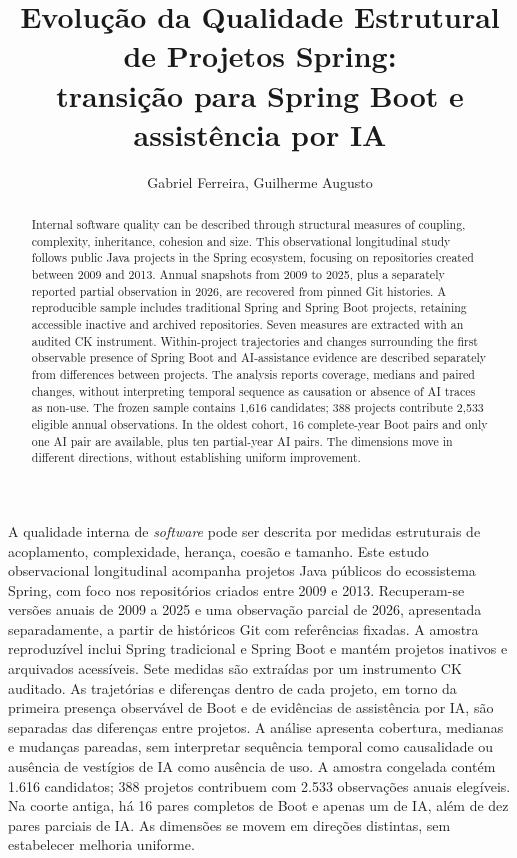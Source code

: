 \documentclass[12pt]{article}
\title{Evolução da Qualidade Estrutural de Projetos Spring:\\transição para Spring Boot e assistência por IA}
\author{Gabriel Ferreira\inst{1}, Guilherme Augusto\inst{1}}
\begin{document}
\maketitle

\begin{abstract}
Internal software quality can be described through structural measures of coupling, complexity, inheritance, cohesion and size. This observational longitudinal study follows public Java projects in the Spring ecosystem, focusing on repositories created between 2009 and 2013. Annual snapshots from 2009 to 2025, plus a separately reported partial observation in 2026, are recovered from pinned Git histories. A reproducible sample includes traditional Spring and Spring Boot projects, retaining accessible inactive and archived repositories. Seven measures are extracted with an audited CK instrument. Within-project trajectories and changes surrounding the first observable presence of Spring Boot and AI-assistance evidence are described separately from differences between projects. The analysis reports coverage, medians and paired changes, without interpreting temporal sequence as causation or absence of AI traces as non-use. The frozen sample contains 1,616 candidates; 388 projects contribute 2,533 eligible annual observations. In the oldest cohort, 16 complete-year Boot pairs and only one AI pair are available, plus ten partial-year AI pairs. The dimensions move in different directions, without establishing uniform improvement.
\end{abstract}

\begin{resumo}
A qualidade interna de \emph{software} pode ser descrita por medidas estruturais de acoplamento, complexidade, herança, coesão e tamanho. Este estudo observacional longitudinal acompanha projetos Java públicos do ecossistema Spring, com foco nos repositórios criados entre 2009 e 2013. Recuperam-se versões anuais de 2009 a 2025 e uma observação parcial de 2026, apresentada separadamente, a partir de históricos Git com referências fixadas. A amostra reproduzível inclui Spring tradicional e Spring Boot e mantém projetos inativos e arquivados acessíveis. Sete medidas são extraídas por um instrumento CK auditado. As trajetórias e diferenças dentro de cada projeto, em torno da primeira presença observável de Boot e de evidências de assistência por IA, são separadas das diferenças entre projetos. A análise apresenta cobertura, medianas e mudanças pareadas, sem interpretar sequência temporal como causalidade ou ausência de vestígios de IA como ausência de uso. A amostra congelada contém 1.616 candidatos; 388 projetos contribuem com 2.533 observações anuais elegíveis. Na coorte antiga, há 16 pares completos de Boot e apenas um de IA, além de dez pares parciais de IA. As dimensões se movem em direções distintas, sem estabelecer melhoria uniforme.
\end{resumo}
\end{document}
